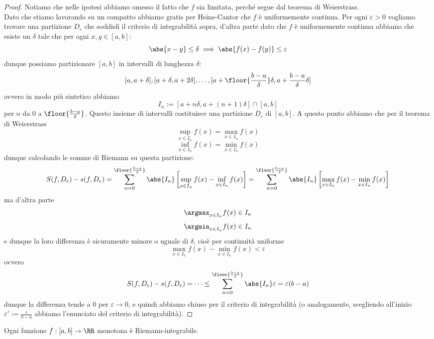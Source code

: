\documentclass[11pt]{scrartcl}
\begin{document}
	\begin{proof}
		Notiamo che nelle ipotesi abbiamo omesso il fatto che $f$ sia limitata, perché segue dal teorema di Weierstrass. \\
		Dato che stiamo lavorando su un compatto abbiamo gratis per Heine-Cantor che $f$ è uniformemente continua. Per ogni $\varepsilon>0$ vogliamo trovare una partizione $D_\varepsilon$ che soddisfi il criterio di integrabilità sopra, d'altra parte dato che $f$ è uniformemente continua abbiamo che esiste un $\delta$ tale che per ogni $x,y\in [a,b]$:
		$$\abs{x-y}\le \delta \implies \abs{f(x)-f(y)}\le \varepsilon$$
		dunque possiamo partizionare $[a,b]$ in intervalli di lunghezza $\delta$:
		$$[a,a+\delta],[a+\delta,a+2\delta],\dots,[a+\floor{\frac{b-a}{\delta}}\delta,a+\frac{b-a}{\delta}\delta]$$
		ovvero in modo più sintetico abbiamo
		$$I_n:=\left[a+n\delta,a+(n+1)\delta\right]\cap [a,b]$$
		per $n$ da $0$ a $\floor{\frac{b-a}{\delta}}$. Questo insieme di intervalli costituisce una partizione $D_\varepsilon$ di $[a,b]$. A questo punto abbiamo che per il teorema di Weierstrass
		$$\sup_{x\in I_n}f(x)=\max_{x\in I_n}f(x)$$
		$$\inf_{x\in I_n}f(x)=\min_{x\in I_n}f(x)$$
		dunque calcolando le somme di Riemann su questa partizione:
		$$S(f,D_\varepsilon)-s(f,D_\varepsilon)=\sum_{n=0}^{\floor{\frac{b-a}{\delta}}}\abs{I_n}\left[\sup_{x\in I_n}f(x)-\inf_{x\in I_n}f(x)\right]=\sum_{n=0}^{\floor{\frac{b-a}{\delta}}}\abs{I_n}\left[\max_{x\in I_n}f(x)-\min_{x\in I_n}f(x)\right]$$
		ma d'altra parte 
		$$\argmax_{x\in I_n} f(x)\in I_n$$
		$$\argmin_{x\in I_n} f(x)\in I_n$$
		e dunque la loro differenza è sicuramente minore o uguale di $\delta$, cioè per continuità uniforme
		$$\max_{x\in I_n}f(x)-\min_{x\in I_n}f(x)<\varepsilon$$
		ovvero
		$$S(f,D_\varepsilon)-s(f,D_\varepsilon)=\dots\le \sum_{n=0}^{\floor{\frac{b-a}{\delta}}}\abs{I_n}\varepsilon=\varepsilon(b-a)$$
		dunque la differenza tende a $0$ per $\varepsilon\to 0$, e quindi abbiamo chiuso per il criterio di integrabilità (o analogamente, scegliendo all'inizio $\varepsilon':=\frac{\varepsilon}{b-a}$ abbiamo l'enunciato del criterio di integrabilità).
	\end{proof}
	\begin{theorem}
		Ogni funzione $f:[a,b]\to\RR$ monotona è Riemann-integrabile.
	\end{theorem}
\end{document}
